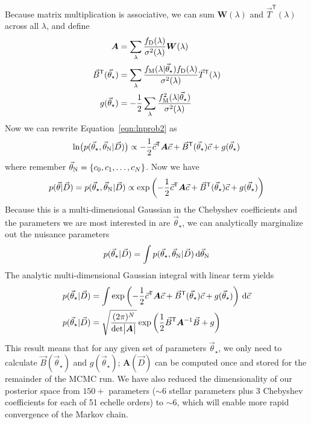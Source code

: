 \documentclass[preprint]{aastex} %
\newcommand{\vt}{\vec{\theta}}
\newcommand{\vstar}{\vt_{\star}}
\newcommand{\vN}{\vt_{\rm N}}
\newcommand{\vc}{\vec{c}}
\newcommand{\fM}{f_{\rm M}}
\newcommand{\fD}{f_{\rm D}}
\newcommand{\vD}{\vec{D}}
\newcommand{\dd}{\,{\rm d}}
\newcommand{\trans}{\mathsf{T}}
\begin{document}
Because matrix multiplication is associative, we can sum ${\bm W(\lambda)}$ and $\vec{T}^\trans(\lambda)$ across all $\lambda$, and define
\begin{align}
  {\bm A} &= \sum_\lambda \frac{\fD(\lambda)}{\sigma^2(\lambda)} {\bm W}(\lambda)\\
  \vec{B}^\trans(\vstar) &= \sum_\lambda \frac{\fM(\lambda | \vstar) \fD(\lambda)}{\sigma^2(\lambda)} \vec{T}^\trans(\lambda)\\
  g(\vstar) &= -\frac{1}{2} \sum_\lambda \frac{\fM^2(\lambda|\vstar)}{\sigma^2(\lambda)}\\
\end{align}
Now we can rewrite Equation~\ref{eqn:lnprob2} as 
\begin{equation}
  \ln \bigl (p(\vstar, \vN | \vD) \bigr) \propto - \frac{1}{2} \vc^\trans {\bm A} \vc + \vec{B}^\trans(\vstar) \vc + g(\vstar)
  \label{eqn:lnprob_matrix}
\end{equation}
where remember $\vN = \{c_0, c_1, \ldots, c_N \}$. Now we have
\begin{equation}
  p(\vt | \vD) = p(\vstar, \vN | \vD) \propto \exp \left ( - \frac{1}{2} \vc^\trans {\bm A} \vc + \vec{B}^\trans(\vstar) \vc + g(\vstar) \right )
  \label{eqn:posterior_vec}
\end{equation}
Because this is a multi-dimensional Gaussian in the Chebyshev coefficients and the parameters we are most interested in are $\vstar$, we can analytically marginalize out the nuisance parameters
\begin{equation}
  p(\vstar | \vD) = \int p(\vstar, \vN | \vD) \dd \vN
\end{equation}
The analytic multi-dimensional Gaussian integral with linear term \citep{sgd+09} yields 
\begin{align}
  p(\vstar | \vD) &= \int \exp \left ( - \frac{1}{2} \vc^\trans {\bm A} \vc + \vec{B}^\trans(\vstar) \vc + g(\vstar) \right ) \dd \vc\\
  p(\vstar | \vD) &= \sqrt{\frac{(2 \pi )^N}{ {\rm det} \bigl |{\bm A} \bigr |}} \exp{ \left ( \frac{1}{2} \vec{B}^\trans {\bm A}^{-1} \vec{B} + g \right )}
\end{align}
This result means that for any given set of parameters $\vstar$, we only need to calculate $\vec{B}(\vstar)$ and $g(\vstar)$; ${\bm A}(\vD)$ can be computed once and stored for the remainder of the MCMC run. We have also reduced the dimensionality of our posterior space from $150+$ parameters ($\sim 6$ stellar parameters plus 3 Chebyshev coefficients for each of 51 echelle orders) to $\sim 6$, which will enable more rapid convergence of the Markov chain.
\end{document}
